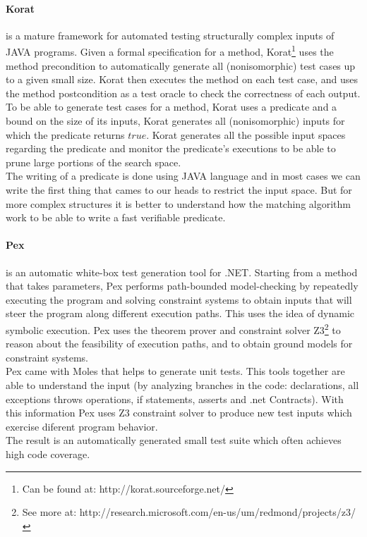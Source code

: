 \documentclass[citeauthoryear]{llncs}
\begin{document}

\paragraph{\textbf{Korat}\cite{Boyapati02korat:automated}}
is a mature framework for automated testing structurally complex inputs of JAVA programs.
Given a formal specification for a method, Korat\footnote{Can be found at: http://korat.sourceforge.net/} uses the method precondition
to automatically generate all (nonisomorphic) test cases up to a given small size.
Korat then executes the method on each test case, and uses the method postcondition as a test oracle to check the correctness of each output.\\
To be able to generate test cases for a method, Korat uses a predicate and a bound on the size of its inputs,
Korat generates all (nonisomorphic) inputs for which the predicate returns $true$.
Korat generates all the possible input spaces regarding the predicate and monitor the predicate's executions to be able to prune large portions of the search space.\\

The writing of a predicate is done using JAVA language and in most cases we can write the first thing that cames to our heads to restrict the input space.
But for more complex structures it is better to understand how the matching algorithm work to be able to write a fast verifiable predicate.

\paragraph{\textbf{Pex}\cite{Tillmann:2008:PWB:1792786.1792798}} is an automatic white-box test generation tool for .NET. Starting from a method that takes parameters, Pex performs path-bounded model-checking
by repeatedly executing the program and solving constraint systems to obtain inputs that will steer the program along different execution paths.
This uses the idea of dynamic symbolic execution\cite{Tillmann06unittests}. Pex uses the theorem prover and
constraint solver Z3\footnote{See more at: http://research.microsoft.com/en-us/um/redmond/projects/z3/} to reason about the feasibility of execution paths, and
to obtain ground models for constraint systems.\\
Pex came with Moles that helps to generate unit tests. This tools together are able to understand the input (by analyzing branches in the code:
declarations, all exceptions throws operations, if statements, asserts and .net Contracts). With this information Pex uses Z3 constraint solver to
produce new test inputs which exercise diferent program behavior.\\
The result is an automatically generated small test suite which often achieves high code coverage.\\
\end{document}
